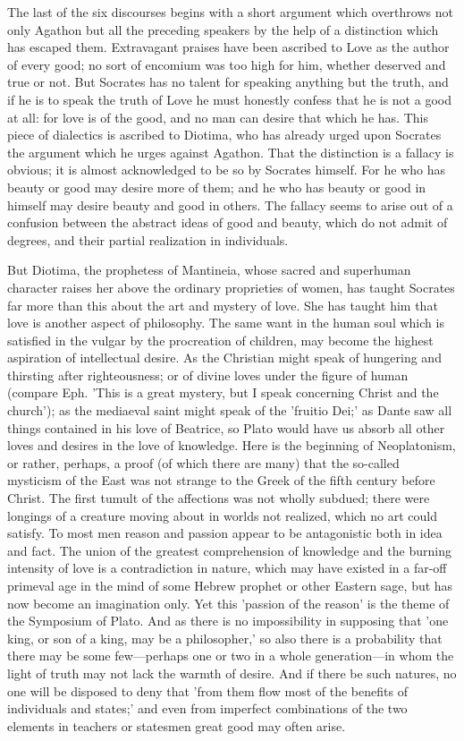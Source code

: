 \documentclass[11pt,letter]{article}
\begin{document}
\par  The last of the six discourses begins with a short argument which overthrows not only Agathon but all the preceding speakers by the help of a distinction which has escaped them. Extravagant praises have been ascribed to Love as the author of every good; no sort of encomium was too high for him, whether deserved and true or not. But Socrates has no talent for speaking anything but the truth, and if he is to speak the truth of Love he must honestly confess that he is not a good at all: for love is of the good, and no man can desire that which he has. This piece of dialectics is ascribed to Diotima, who has already urged upon Socrates the argument which he urges against Agathon. That the distinction is a fallacy is obvious; it is almost acknowledged to be so by Socrates himself. For he who has beauty or good may desire more of them; and he who has beauty or good in himself may desire beauty and good in others. The fallacy seems to arise out of a confusion between the abstract ideas of good and beauty, which do not admit of degrees, and their partial realization in individuals.

\par  But Diotima, the prophetess of Mantineia, whose sacred and superhuman character raises her above the ordinary proprieties of women, has taught Socrates far more than this about the art and mystery of love. She has taught him that love is another aspect of philosophy. The same want in the human soul which is satisfied in the vulgar by the procreation of children, may become the highest aspiration of intellectual desire. As the Christian might speak of hungering and thirsting after righteousness; or of divine loves under the figure of human (compare Eph. 'This is a great mystery, but I speak concerning Christ and the church'); as the mediaeval saint might speak of the 'fruitio Dei;' as Dante saw all things contained in his love of Beatrice, so Plato would have us absorb all other loves and desires in the love of knowledge. Here is the beginning of Neoplatonism, or rather, perhaps, a proof (of which there are many) that the so-called mysticism of the East was not strange to the Greek of the fifth century before Christ. The first tumult of the affections was not wholly subdued; there were longings of a creature moving about in worlds not realized, which no art could satisfy. To most men reason and passion appear to be antagonistic both in idea and fact. The union of the greatest comprehension of knowledge and the burning intensity of love is a contradiction in nature, which may have existed in a far-off primeval age in the mind of some Hebrew prophet or other Eastern sage, but has now become an imagination only. Yet this 'passion of the reason' is the theme of the Symposium of Plato. And as there is no impossibility in supposing that 'one king, or son of a king, may be a philosopher,' so also there is a probability that there may be some few—perhaps one or two in a whole generation—in whom the light of truth may not lack the warmth of desire. And if there be such natures, no one will be disposed to deny that 'from them flow most of the benefits of individuals and states;' and even from imperfect combinations of the two elements in teachers or statesmen great good may often arise.
\end{document}
